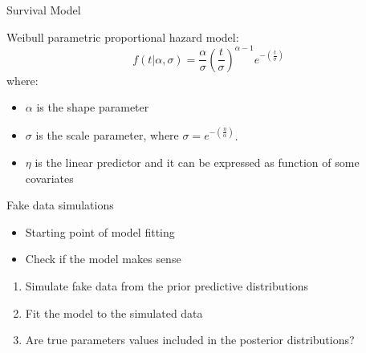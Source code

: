 \documentclass[ignorenonframetext,a4paper]{beamer}
\begin{document}
\begin{frame}{Survival Model}

Weibull parametric proportional hazard model: \[
  f \left( t \vert \alpha, \sigma \right) = \frac{\alpha}{\sigma} \left( \frac{t}{\sigma}\right)^{\alpha - 1} e ^{ - \left( \frac{t}{\sigma} \right) }
  \] where:

\begin{itemize}
 \item{$\alpha$ is the shape parameter}
 \item{$\sigma$ is the scale parameter, where $\sigma = e ^{ - \left( \frac{\eta}{\alpha} \right) }$}.
 \item{$\eta$ is the linear predictor and it can be expressed as 
       function of some covariates}
\end{itemize}

\end{frame}

\begin{frame}{Fake data simulations}

\begin{itemize}
  \item{Starting point of model fitting}
  \item{Check if the model makes sense}
\end{itemize}

\begin{enumerate}
  \item{Simulate fake data from the prior predictive distributions}
  \item{Fit the model to the simulated data}
  \item{Are true parameters values included in the posterior 
        distributions?}
\end{enumerate}

\end{frame}
\end{document}
